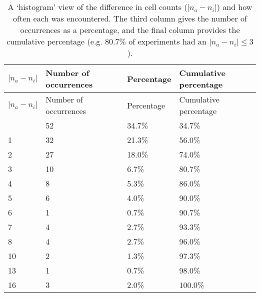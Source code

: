 \startrowcolors
\begin{longtable}{l|l|l|l}
\caption{A `histogram' view of the difference in cell counts ($|n_a - n_i|$) and how
often each was encountered.
The third column gives the number of occurrences as a percentage, and the
final column provides the cumulative percentage (e.g. 80.7\% of
experiments had an $|n_a - n_i| \leq 3$).} \\
\hline
\rowcolor{white}
$|n_a - n_i|$ & Number of occurrences & Percentage & Cumulative percentage\\ \hline
\endfirsthead
\hline
\rowcolor{white}
$|n_a - n_i|$ & Number of occurrences & Percentage & Cumulative percentage\\ \hline
\endhead
\hline
\endfoot
 0 & 52 & 34.7\% &  34.7\% \\
 1 & 32 & 21.3\% &  56.0\% \\
 2 & 27 & 18.0\% &  74.0\% \\
 3 & 10 &  6.7\% &  80.7\% \\
 4 &  8 &  5.3\% &  86.0\% \\
 5 &  6 &  4.0\% &  90.0\% \\
 6 &  1 &  0.7\% &  90.7\% \\
 7 &  4 &  2.7\% &  93.3\% \\
 8 &  4 &  2.7\% &  96.0\% \\
10 &  2 &  1.3\% &  97.3\% \\
13 &  1 &  0.7\% &  98.0\% \\
16 &  3 &  2.0\% & 100.0\% \\
\end{longtable}
